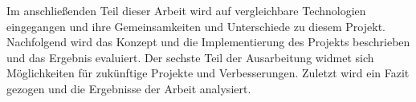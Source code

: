 Im anschließenden Teil dieser Arbeit wird auf vergleichbare Technologien eingegangen und ihre Gemeinsamkeiten und Unterschiede zu diesem Projekt. Nachfolgend wird das Konzept und die Implementierung des Projekts beschrieben und das Ergebnis evaluiert. Der sechste Teil der Ausarbeitung widmet sich Möglichkeiten für zukünftige Projekte und Verbesserungen. Zuletzt wird ein Fazit gezogen und die Ergebnisse der Arbeit analysiert.